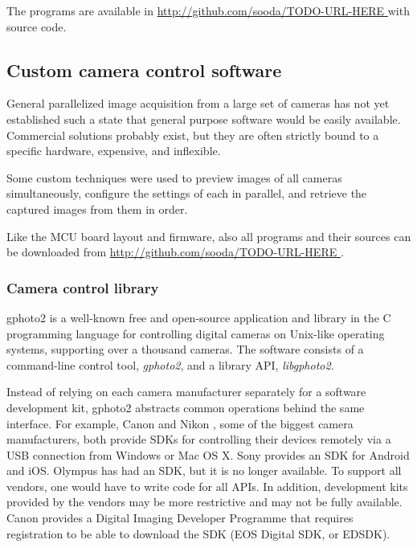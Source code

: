 The programs are available in \url { http://github.com/sooda/TODO-URL-HERE } with source code.


\subsection{Custom camera control software} %

General parallelized image acquisition from a large set of cameras has not yet established such a state that general purpose software would be easily available.
Commercial solutions probably exist, but they are often strictly bound to a specific hardware, expensive, and inflexible.

Some custom techniques were used to preview images of all cameras simultaneously, configure the settings of each in parallel, and retrieve the captured images from them in order.

Like the MCU board layout and firmware, also all programs and their sources can be downloaded from \url { http://github.com/sooda/TODO-URL-HERE }.


\subsubsection{Camera control library} %

gphoto2 \cite{gphoto2} is a well-known free and open-source application and library in the C programming language for controlling digital cameras on Unix-like operating systems, supporting over a thousand cameras.
The software consists of a command-line control tool, \emph{gphoto2}, and a library API, \emph{libgphoto2}.

Instead of relying on each camera manufacturer separately for a software development kit, gphoto2 abstracts common operations behind the same interface.
For example, Canon \cite{canonsdk} and Nikon \cite{nikonsdk}, some of the biggest camera manufacturers, both provide SDKs for controlling their devices remotely via a USB connection from Windows or Mac OS X.
Sony provides an SDK for Android and iOS.
Olympus has had an SDK, but it is no longer available.
To support all vendors, one would have to write code for all APIs.
In addition, development kits provided by the vendors may be more restrictive and may not be fully available.
Canon provides a Digital Imaging Developer Programme that requires registration to be able to download the SDK (EOS Digital SDK, or EDSDK).

